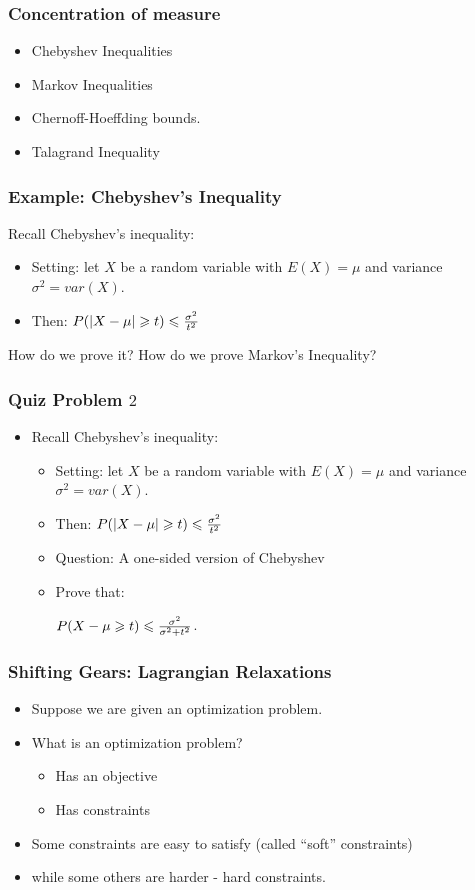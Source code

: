 \documentclass{beamer}
\begin{document}
\begin{frame}
\frametitle{Concentration of measure}
\begin{itemize}
\item Chebyshev Inequalities
\item Markov Inequalities
\item Chernoff-Hoeffding bounds.
\item Talagrand Inequality
\end{itemize}
\end{frame}

\begin{frame}
\frametitle{Example: Chebyshev's Inequality}
Recall Chebyshev's inequality: 
\begin{itemize}
\item Setting: let $X$ be a random variable with $E(X)= \mu$ and variance $\sigma^2 = var(X)$. 
\item Then: $P( | X - \mu | \geqslant t ) \leqslant \frac{\sigma^2}{t^2}$
\end{itemize}

\pause How do we prove it?
\pause How do we prove Markov's Inequality?
\end{frame}

\begin{frame}
\frametitle{Quiz Problem $2$}
\begin{itemize}
\item Recall Chebyshev's inequality: 
\begin{itemize}
\item Setting: let $X$ be a random variable with $E(X)= \mu$ and variance $\sigma^2 = var(X)$. 
\item Then: $P( | X - \mu | \geqslant t ) \leqslant \frac{\sigma^2}{t^2}$
\pause
\item Question: A one-sided version of Chebyshev
\pause
\item Prove that: 
\begin{center}
{\color{red}
$P( X - \mu \geqslant t ) \leqslant \frac{\sigma^2}{\sigma^2 + t^2}$. 
}
\end{center}
\end{itemize}
\end{itemize}
\end{frame}

\begin{frame}
\frametitle{Shifting Gears: Lagrangian Relaxations}
\begin{itemize}
\item Suppose we are given an optimization problem. 
\item What is an optimization problem? 
\begin{itemize}
\item Has an {\color{red} objective}
\item Has {\color{blue} constraints}
\end{itemize}
\pause
\item Some constraints are easy to satisfy \pause (called ``soft'' constraints)
\pause 
\item while some others are harder - hard constraints. 
\end{itemize}
\end{frame}
\end{document}
